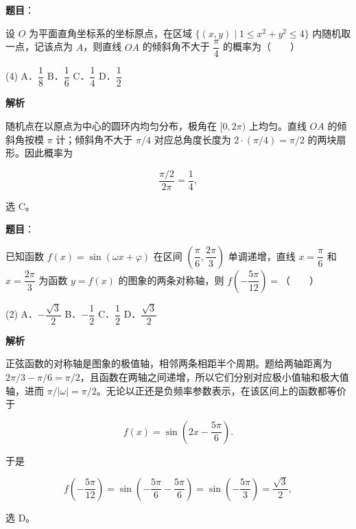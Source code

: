\begin{answer}

\textbf{题目}：

设 $O$ 为平面直角坐标系的坐标原点，在区域 $\{(x,y)\mid 1\leqslant x^2+y^2\leqslant4\}$ 内随机取一点，记该点为 $A$，则直线 $OA$ 的倾斜角不大于 $\dfrac\pi4$ 的概率为\mbox{（　　）}

\begin{gkopts}(4)
\task A．$\dfrac18$
\task B．$\dfrac16$
\task C．$\dfrac14$
\task D．$\dfrac12$
\end{gkopts}

\textbf{解析}

随机点在以原点为中心的圆环内均匀分布，极角在 $[0,2\pi)$ 上均匀。直线 $OA$ 的倾斜角按模 $\pi$ 计；倾斜角不大于 $\pi/4$ 对应总角度长度为 $2\cdot(\pi/4)=\pi/2$ 的两块扇形。因此概率为

\nopagebreak[4]
\[
\frac{\pi/2}{2\pi}=\frac14,
\]

选 C。


\end{answer}
\begin{answer}

\textbf{题目}：

已知函数 $f(x)=\sin(\omega x+\varphi)$ 在区间 $\left(\dfrac\pi6,\dfrac{2\pi}3\right)$ 单调递增，直线 $x=\dfrac\pi6$ 和 $x=\dfrac{2\pi}3$ 为函数 $y=f(x)$ 的图象的两条对称轴，则 $f\left(-\dfrac{5\pi}{12}\right)=$\mbox{（　　）}

\begin{gkopts}(2)
\task A．$-\dfrac{\sqrt3}{2}$
\task B．$-\dfrac12$
\task C．$\dfrac12$
\task D．$\dfrac{\sqrt3}{2}$
\end{gkopts}

\textbf{解析}

正弦函数的对称轴是图象的极值轴，相邻两条相距半个周期。题给两轴距离为 $2\pi/3-\pi/6=\pi/2$，且函数在两轴之间递增，所以它们分别对应极小值轴和极大值轴，进而 $\pi/|\omega|=\pi/2$。无论以正还是负频率参数表示，在该区间上的函数都等价于

\nopagebreak[4]
\[
f(x)=\sin\left(2x-\frac{5\pi}{6}\right).
\]

于是

\nopagebreak[4]
\[
f\left(-\frac{5\pi}{12}\right)
=\sin\left(-\frac{5\pi}{6}-\frac{5\pi}{6}\right)
=\sin\left(-\frac{5\pi}{3}\right)=\frac{\sqrt3}{2},
\]

选 D。


\end{answer}
